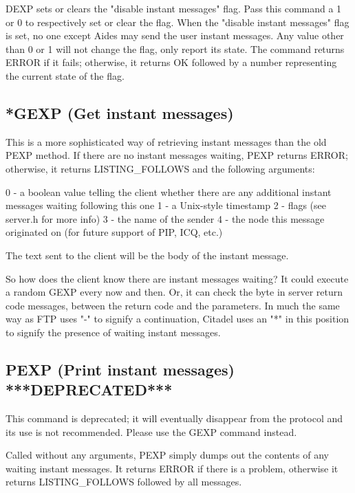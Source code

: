  DEXP sets or clears the "disable instant messages" flag.  Pass this command a
1 or 0 to respectively set or clear the flag.  When the "disable instant
messages" flag is set, no one except Aides may send the user instant messages.
Any value other than 0 or 1 will not change the flag, only report its state.
The command returns ERROR if it fails; otherwise, it returns OK followed by a
number representing the current state of the flag.



\subsection{*GEXP (Get instant messages)}

 This is a more sophisticated way of retrieving instant messages than the old
PEXP method.  If there are no instant messages waiting, PEXP returns ERROR;
otherwise, it returns LISTING_FOLLOWS and the following arguments:

 0 - a boolean value telling the client whether there are any additional
     instant messages waiting following this one
 1 - a Unix-style timestamp
 2 - flags (see server.h for more info)
 3 - the name of the sender
 4 - the node this message originated on (for future support of PIP, ICQ, etc.)

 The text sent to the client will be the body of the instant message.

 So how does the client know there are instant messages waiting?  It could
execute a random GEXP every now and then.  Or, it can check the byte in
server return code messages, between the return code and the parameters.  In
much the same way as FTP uses "-" to signify a continuation, Citadel uses
an "*" in this position to signify the presence of waiting instant messages.



\subsection{PEXP (Print instant messages) ***DEPRECATED***}

 This command is deprecated; it will eventually disappear from the protocol and
its use is not recommended.  Please use the GEXP command instead.

 Called without any arguments, PEXP simply dumps out the contents
of any waiting instant messages.  It returns ERROR if there is a problem,
otherwise it returns LISTING_FOLLOWS followed by all messages.

